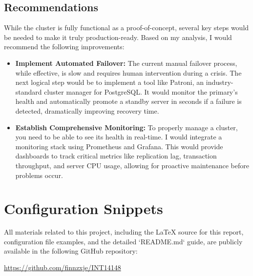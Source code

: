 \documentclass[conference]{IEEEtran}
\begin{document}
\subsection{Recommendations}

While the cluster is fully functional as a proof-of-concept, several key steps would be needed to make it truly production-ready. Based on my analysis, I would recommend the following improvements:

\begin{itemize}
\item \textbf{Implement Automated Failover:} The current manual failover process, while effective, is slow and requires human intervention during a crisis. The next logical step would be to implement a tool like Patroni, an industry-standard cluster manager for PostgreSQL. It would monitor the primary's health and automatically promote a standby server in seconds if a failure is detected, dramatically improving recovery time.

\item \textbf{Establish Comprehensive Monitoring:} To properly manage a cluster, you need to be able to see its health in real-time. I would integrate a monitoring stack using Prometheus and Grafana. This would provide dashboards to track critical metrics like replication lag, transaction throughput, and server CPU usage, allowing for proactive maintenance before problems occur.

\end{itemize}
\appendices

\section{Configuration Snippets}

All materials related to this project, including the LaTeX source for this report, configuration file examples, and the detailed `README.md` guide, are publicly available in the following GitHub repository:

\url{https://github.com/finnzxje/INT14148}


%
%
%
%
%
%
%
%
%
%
\end{document}
